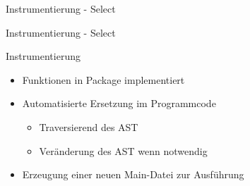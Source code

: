 \documentclass[aspectratio=169]{beamer}  %
\begin{document}

\begin{frame}{Instrumentierung - Select}
  
\end{frame}

\begin{frame}{Instrumentierung - Select}
  \begin{minipage}{0.55\textwidth}
      
  \end{minipage}
  \hfill
  \vrule{}
  \hfill
  \begin{minipage}{0.43\textwidth}
    
  \end{minipage}
\end{frame}

\begin{frame}{Instrumentierung}
  \begin{itemize}
    \item Funktionen in Package implementiert
    \item Automatisierte Ersetzung im Programmcode
    \begin{itemize}
      \item Traversierend des AST
      \item Veränderung des AST wenn notwendig
    \end{itemize}
    \item Erzeugung einer neuen Main-Datei zur Ausführung
  \end{itemize}
\end{frame}
\end{document}
